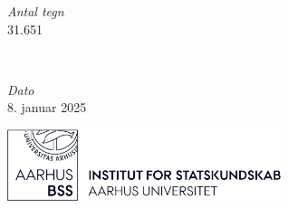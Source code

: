 
	\begin{minipage}{0.4\textwidth}
		\begin{flushleft}
			\large
			\textit{Antal tegn}\\
			31.651\\
		\end{flushleft}
	\end{minipage}
	~
	\begin{minipage}{0.4\textwidth}
		\begin{flushright}
			\large
			\textit{Dato}\\
			8. januar 2025
		\end{flushright}
	\end{minipage}


	\vfill\vfill
	\includegraphics[width=0.6\textwidth]{tex/images/ifsk-logo-black.png}
